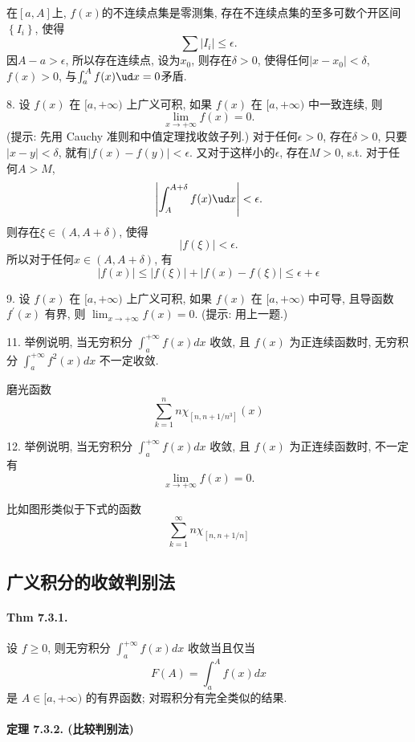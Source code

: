 在$[a,A]$上, $f(x)$的不连续点集是零测集, 存在不连续点集的至多可数个开区间$\left\{ I_{i}\right\} $,
使得
\[
\sum\left|I_{i}\right|\le\epsilon.
\]
因$A-a>\epsilon$, 所以存在连续点, 设为$x_{0}$, 则存在$\delta>0$, 使得任何$\left|x-x_{0}\right|<\delta$,
$f(x)>0$, 与$\int_{a}^{A}f(x)\ud x=0$矛盾.

8. 设 $f(x)$ 在 $[a,+\infty)$ 上广义可积, 如果 $f(x)$ 在 $[a,+\infty)$ 中一致连续,
则 
\[
\lim_{x\rightarrow+\infty}f(x)=0.
\]
(提示: 先用 Cauchy 准则和中值定理找收敛子列.) 对于任何$\epsilon>0$, 存在$\delta>0$, 只要$\left|x-y\right|<\delta$,
就有$\left|f(x)-f(y)\right|<\epsilon$. 又对于这样小的$\epsilon$, 存在$M>0$,
s.t. 对于任何$A>M$,
\[
\left|\int_{A}^{A+\delta}f(x)\ud x\right|<\epsilon.
\]
则存在$\xi\in(A,A+\delta)$, 使得
\[
\left|f(\xi)\right|<\epsilon.
\]
所以对于任何$x\in(A,A+\delta)$, 有
\[
\left|f(x)\right|\le\left|f(\xi)\right|+\left|f(x)-f(\xi)\right|\le\epsilon+\epsilon
\]

9. 设 $f(x)$ 在 $[a,+\infty)$ 上广义可积, 如果 $f(x)$ 在 $[a,+\infty)$ 中可导,
且导函数 $f^{\prime}(x)$ 有界, 则 $\lim_{x\rightarrow+\infty}f(x)=0$. (提示:
用上一题.)

11. 举例说明, 当无穷积分 $\int_{a}^{+\infty}f(x)dx$ 收敛, 且 $f(x)$ 为正连续函数时,
无穷积分 $\int_{a}^{+\infty}f^{2}(x)dx$ 不一定收敛.

磨光函数
\[
\sum_{k=1}^{n}n\chi_{[n,n+1/n^{3}]}(x)
\]

12. 举例说明, 当无穷积分 $\int_{a}^{+\infty}f(x)dx$ 收敛, 且 $f(x)$ 为正连续函数时,
不一定有 
\[
\lim_{x\rightarrow+\infty}f(x)=0.
\]

比如图形类似于下式的函数
\[
\sum_{k=1}^{\infty}n\chi_{[n,n+1/n]}
\]


\subsection{广义积分的收敛判别法}

\paragraph{Thm 7.3.1.}

设 $f\geqslant0$, 则无穷积分 $\int_{a}^{+\infty}f(x)dx$ 收敛当且仅当 
\[
F(A)=\int_{a}^{A}f(x)dx
\]
是 $A\in[a,+\infty)$ 的有界函数; 对瑕积分有完全类似的结果.

\paragraph{定理 7.3.2. (比较判别法)}

